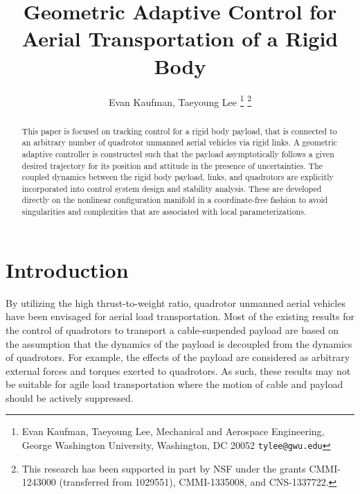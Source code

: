 \documentclass[letterpaper, 10pt, conference]{ieeeconf}
\title{\LARGE \bf
Geometric Adaptive Control for Aerial Transportation of a Rigid Body}
\author{Evan Kaufman, Taeyoung Lee%
\thanks{Evan Kaufman, Taeyoung Lee, Mechanical and Aerospace Engineering, George Washington University, Washington, DC 20052 {\tt tylee@gwu.edu}}%
\thanks{This research has been supported in part by NSF under the grants CMMI-1243000 (transferred from 1029551), CMMI-1335008, and CNS-1337722.}
}
\begin{document}
\allowdisplaybreaks


\maketitle \thispagestyle{empty} \pagestyle{empty}

\begin{abstract}
This paper is focused on tracking control for a rigid body payload, that is connected to an arbitrary number of quadrotor unmanned aerial vehicles via rigid links. A geometric adaptive controller is constructed such that the payload asymptotically follows a given desired trajectory for its position and attitude in the presence of uncertainties. The coupled dynamics between the rigid body payload, links, and quadrotors are explicitly incorporated into control system design and stability analysis. These are developed directly on the nonlinear configuration manifold in a coordinate-free fashion to avoid singularities and complexities that are associated with local parameterizations. %
\end{abstract}

\section{Introduction}




By utilizing the high thrust-to-weight ratio, quadrotor unmanned aerial vehicles have been envisaged for aerial load transportation. Most of the existing results for the control of quadrotors to transport a cable-suspended payload are based on the assumption that the dynamics of the payload is decoupled from the dynamics of quadrotors. For example, the effects of the payload are considered as arbitrary external forces and torques exerted to quadrotors. As such, these results may not be suitable for agile load transportation where the motion of cable and payload should be actively suppressed.
\end{document}
